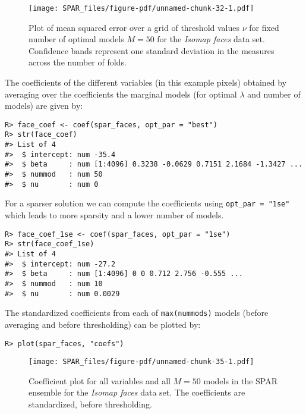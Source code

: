 \documentclass[
  article]{jss}
\begin{document}
\begin{figure}[H]

{\centering \texttt{[image: SPAR\_files/figure-pdf/unnamed-chunk-32-1.pdf]}

}

\caption{Plot of mean squared error over a grid of threshold values
\(\nu\) for fixed number of optimal models \(M=50\) for the
\emph{Isomap faces} data set. Confidence bands represent one standard
deviation in the measures across the number of folds.
\label{fig:facesplot_valmeasure}}

\end{figure}%

The coefficients of the different variables (in this example pixels)
obtained by averaging over the coefficients the marginal models (for
optimal \(\lambda\) and number of models) are given by:

\begin{verbatim}
R> face_coef <- coef(spar_faces, opt_par = "best")
R> str(face_coef)
#> List of 4
#>  $ intercept: num -35.4
#>  $ beta     : num [1:4096] 0.3238 -0.0629 0.7151 2.1684 -1.3427 ...
#>  $ nummod   : num 50
#>  $ nu       : num 0
\end{verbatim}

For a sparser solution we can compute the coefficients using
\texttt{opt\_par\ =\ "1se"} which leads to more sparsity and a lower
number of models.

\begin{verbatim}
R> face_coef_1se <- coef(spar_faces, opt_par = "1se")
R> str(face_coef_1se)
#> List of 4
#>  $ intercept: num -27.2
#>  $ beta     : num [1:4096] 0 0 0.712 2.756 -0.555 ...
#>  $ nummod   : num 10
#>  $ nu       : num 0.0029
\end{verbatim}

The standardized coefficients from each of \texttt{max(nummods)} models
(before averaging and before thresholding) can be plotted by:

\begin{verbatim}
R> plot(spar_faces, "coefs")
\end{verbatim}

\begin{figure}[H]

{\centering \texttt{[image: SPAR\_files/figure-pdf/unnamed-chunk-35-1.pdf]}

}

\caption{Coefficient plot for all variables and all \(M=50\) models in
the SPAR ensemble for the \emph{Isomap faces} data set. The coefficients
are standardized, before thresholding. \label{fig:faces_coefs}}

\end{figure}%
\end{document}
